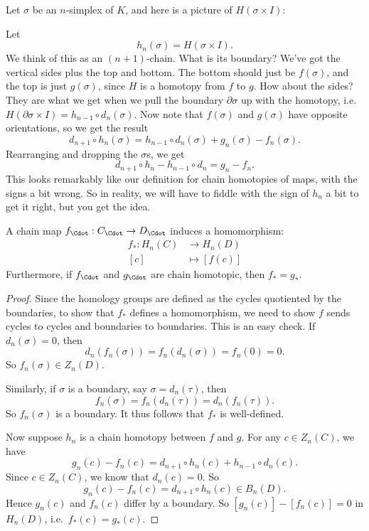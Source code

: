 \documentclass[a4paper]{article}
\begin{document}
Let $\sigma$ be an $n$-simplex of $K$, and here is a picture of $H(\sigma \times I)$:
\begin{center}
\end{center}
Let
\[
  h_n(\sigma) = H(\sigma \times I).
\]
We think of this as an $(n + 1)$-chain. What is its boundary? We've got the vertical sides plus the top and bottom. The bottom should just be $f(\sigma)$, and the top is just $g(\sigma)$, since $H$ is a homotopy from $f$ to $g$. How about the sides? They are what we get when we pull the boundary $\partial \sigma$ up with the homotopy, i.e.\ $H(\partial \sigma \times I) = h_{n - 1} \circ d_n(\sigma)$. Now note that $f(\sigma)$ and $g(\sigma)$ have opposite orientations, so we get the result
\[
  d_{n + 1} \circ h_n(\sigma) = h_{n - 1}\circ d_n(\sigma) + g_n(\sigma) - f_n(\sigma).
\]
Rearranging and dropping the $\sigma$s, we get
\[
  d_{n + 1} \circ h_n - h_{n - 1}\circ d_n = g_n - f_n.
\]
This looks remarkably like our definition for chain homotopies of maps, with the signs a bit wrong. So in reality, we will have to fiddle with the sign of $h_n$ a bit to get it right, but you get the idea.

\begin{lemma}
  A chain map $f_{\Cdot}: C_{\Cdot} \to D_{\Cdot}$ induces a homomorphism:
  \begin{align*}
    f_*: H_n(C) &\to H_n(D)\\
    [c] &\mapsto [f(c)]
  \end{align*}
  Furthermore, if $f_{\Cdot}$ and $g_{\Cdot}$ are chain homotopic, then $f_* = g_*$.
\end{lemma}

\begin{proof}
  Since the homology groups are defined as the cycles quotiented by the boundaries, to show that $f_*$ defines a homomorphism, we need to show $f$ sends cycles to cycles and boundaries to boundaries. This is an easy check. If $d_n (\sigma) = 0$, then
  \[
    d_n (f_n(\sigma)) = f_n(d_n(\sigma)) = f_n(0) = 0.
  \]
  So $f_n(\sigma) \in Z_n(D)$.

  Similarly, if $\sigma$ is a boundary, say $\sigma = d_n (\tau)$, then
  \[
    f_n(\sigma) = f_n(d_n(\tau)) = d_n(f_n(\tau)).
  \]
  So $f_n(\sigma)$ is a boundary. It thus follows that $f_*$ is well-defined.

  Now suppose $h_n$ is a chain homotopy between $f$ and $g$. For any $c \in Z_n(C)$, we have
  \[
    g_n(c) - f_n(c) = d_{n + 1} \circ h_n(c) + h_{n - 1} \circ d_n(c).
  \]
  Since $c \in Z_n(C)$, we know that $d_n(c) = 0$. So
  \[
    g_n(c) - f_n(c) = d_{n + 1} \circ h_n(c) \in B_n(D).
  \]
  Hence $g_n(c)$ and $f_n(c)$ differ by a boundary. So $[g_n(c)] - [f_n(c)] = 0$ in $H_n(D)$, i.e.\ $f_*(c) = g_*(c)$.
\end{proof}
\end{document}
